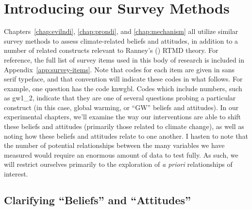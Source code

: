 \graphicspath{{survey-methods/}}

\chapter{Introducing our Survey Methods}
\label{chap:survey}

Chapters~\ref{chap:evilndi}, \ref{chap:prondi}, and \ref{chap:mechanism} all
utilize similar survey methods to assess climate-related beliefs and attitudes,
in addition to a number of related constructs relevant to Ranney's
(\citeyear{ranney_why_2012}) RTMD theory. For reference, the full list of survey
items used in this body of research is included in
Appendix~\ref{app:survey-items}. Note that codes for each item are given in
\textsf{sans serif} typeface, and that convention will indicate these codes in
what follows. For example, one question has the code \textsf{knwgbl}. Codes
which include numbers, such as \textsf{gw1_2}, indicate that they are one of
several questions probing a particular construct (in this case, global warming,
or “GW” beliefs and attitudes).  In our experimental chapters, we'll examine the
way our interventions are able to shift these beliefs and attitudes (primarily
those related to climate change), as well as noting how these beliefs and
attitudes relate to one another.  I hasten to note that the number of potential
relationships between the many variables we have measured would require an
enormous amount of data to test fully. As such, we will restrict ourselves
primarily to the exploration of \emph{a priori} relationships of interest.

\section{Clarifying \texorpdfstring{“Beliefs”}{"Beliefs"} and
    \texorpdfstring{“Attitudes”}{"Attitudes"}}

